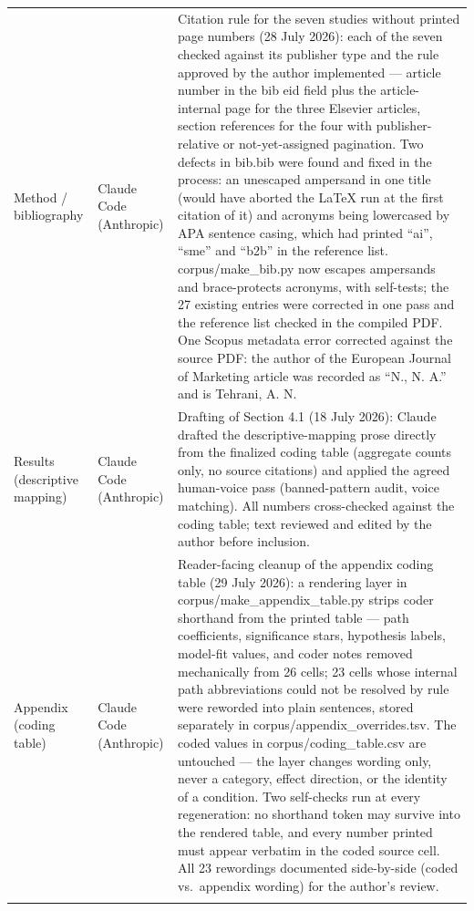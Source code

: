 \begin{longtable}{@{}p{2.9cm}p{3.2cm}p{9.0cm}@{}}
\addlinespace
Method / bibliography & Claude Code (Anthropic) & Citation rule for the seven studies without printed page numbers (28 July 2026): each of the seven checked against its publisher type and the rule approved by the author implemented --- article number in the bib eid field plus the article-internal page for the three Elsevier articles, section references for the four with publisher-relative or not-yet-assigned pagination. Two defects in bib.bib were found and fixed in the process: an unescaped ampersand in one title (would have aborted the LaTeX run at the first citation of it) and acronyms being lowercased by APA sentence casing, which had printed ``ai'', ``sme'' and ``b2b'' in the reference list. corpus/make\_bib.py now escapes ampersands and brace-protects acronyms, with self-tests; the 27 existing entries were corrected in one pass and the reference list checked in the compiled PDF. One Scopus metadata error corrected against the source PDF: the author of the European Journal of Marketing article was recorded as ``N., N. A.'' and is Tehrani, A. N. \\
\addlinespace
Results (descriptive mapping) & Claude Code (Anthropic) & Drafting of Section 4.1 (18 July 2026): Claude drafted the descriptive-mapping prose directly from the finalized coding table (aggregate counts only, no source citations) and applied the agreed human-voice pass (banned-pattern audit, voice matching). All numbers cross-checked against the coding table; text reviewed and edited by the author before inclusion. \\
\addlinespace
Appendix (coding table) & Claude Code (Anthropic) & Reader-facing cleanup of the appendix coding table (29 July 2026): a rendering layer in corpus/make\_appendix\_table.py strips coder shorthand from the printed table --- path coefficients, significance stars, hypothesis labels, model-fit values, and coder notes removed mechanically from 26 cells; 23 cells whose internal path abbreviations could not be resolved by rule were reworded into plain sentences, stored separately in corpus/appendix\_overrides.tsv. The coded values in corpus/coding\_table.csv are untouched --- the layer changes wording only, never a category, effect direction, or the identity of a condition. Two self-checks run at every regeneration: no shorthand token may survive into the rendered table, and every number printed must appear verbatim in the coded source cell. All 23 rewordings documented side-by-side (coded vs.\ appendix wording) for the author's review. \\
\addlinespace

\end{longtable}
